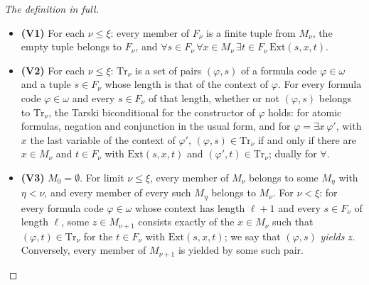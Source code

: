 \documentclass[11pt]{article}
\begin{document}
\begin{proof}[The definition in full]
\begin{itemize}
\item \textbf{(V1)} For each $\nu \le \xi$: every member of $F_\nu$ is a finite tuple from $M_\nu$, the empty tuple
  belongs to $F_\nu$, and
  $\forall s \in F_\nu\, \forall x \in M_\nu\, \exists t \in F_\nu\, \mathrm{Ext}(s, x, t)$.
\item \textbf{(V2)} For each $\nu \le \xi$: $\mathrm{Tr}_\nu$ is a set of pairs $(\varphi, s)$ of a formula code
  $\varphi \in \omega$ and a tuple $s \in F_\nu$ whose length is that of the context of $\varphi$. For every formula
  code $\varphi \in \omega$ and every $s \in F_\nu$ of that length, whether or not $(\varphi, s)$ belongs to
  $\mathrm{Tr}_\nu$, the Tarski biconditional for the constructor of $\varphi$ holds: for atomic formulas, negation
  and conjunction in the usual form, and for $\varphi = \exists x\, \varphi'$, with $x$ the last variable of the
  context of $\varphi'$, $(\varphi, s) \in \mathrm{Tr}_\nu$ if and only if there are $x \in M_\nu$ and $t \in F_\nu$
  with $\mathrm{Ext}(s, x, t)$ and $(\varphi', t) \in \mathrm{Tr}_\nu$; dually for $\forall$.
\item \textbf{(V3)} $M_0 = \emptyset$. For limit $\nu \le \xi$, every member of $M_\nu$ belongs to some $M_\eta$ with
  $\eta < \nu$, and every member of every such $M_\eta$ belongs to $M_\nu$. For $\nu < \xi$: for every formula code
  $\varphi \in \omega$ whose context has length $\ell + 1$ and every $s \in F_\nu$ of length $\ell$, some
  $z \in M_{\nu+1}$ consists exactly of the $x \in M_\nu$ such that $(\varphi, t) \in \mathrm{Tr}_\nu$ for the
  $t \in F_\nu$ with $\mathrm{Ext}(s, x, t)$; we say that $(\varphi, s)$ \emph{yields} $z$. Conversely, every member
  of $M_{\nu+1}$ is yielded by some such pair.
\end{itemize}
\end{proof}
\end{document}
